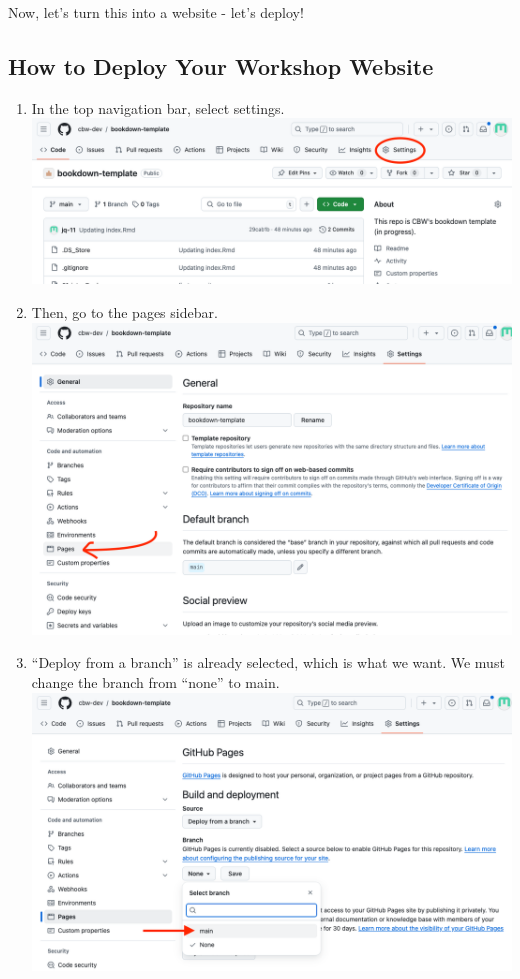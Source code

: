 \documentclass[
]{book}
\theoremstyle{definition}
\theoremstyle{definition}
\theoremstyle{definition}
\theoremstyle{definition}
\theoremstyle{remark}
\begin{document}
Now, let's turn this into a website - let's deploy!

\subsection{How to Deploy Your Workshop Website}\label{how-to-deploy-your-workshop-website}

\begin{enumerate}
\def\labelenumi{\arabic{enumi}.}
\item
  In the top navigation bar, select settings.
  \includegraphics{img/git-instruct/github-settings.png}
\item
  Then, go to the pages sidebar.
  \includegraphics{img/git-instruct/github-select-pages.png}
\item
  ``Deploy from a branch'' is already selected, which is what we want. We must change the branch from ``none'' to main.
  \includegraphics{img/git-instruct/github-deploy-main.png}

\end{enumerate}
\end{document}
